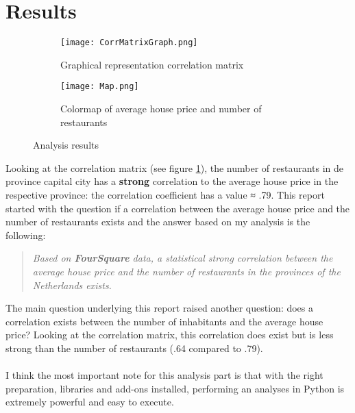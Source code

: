 \section{Results}
\medskip
\begin{figure}[H]
	\begin{subfigure}{0.5\textwidth}
		\centering
		\texttt{[image: CorrMatrixGraph.png]} 
		\caption{Graphical representation correlation matrix}
		\label{corrMatrixGraph}
	\end{subfigure}
	\begin{subfigure}{0.5\textwidth}
		\centering
		\texttt{[image: Map.png]}
		\caption{Colormap of average house price and number of restaurants}
	\end{subfigure}
	\caption{Analysis results}
\end{figure}
\medskip
Looking at the correlation matrix (see figure \ref{corrMatrixGraph}), the number of restaurants in de province capital city has a \textbf{strong} correlation to the average house price in the respective province: the correlation coefficient has a value ≈ .79. This report started with the question if a correlation between the average house price and the number of restaurants exists and the answer based on my analysis is the following:
\medskip
\begin{quote}
\textit{Based on \textbf{FourSquare} data, a statistical strong correlation between the average house price and the number of restaurants in the provinces of the Netherlands exists.}
\end{quote}
\medskip
The main question underlying this report raised another question: does a correlation exists between the number of inhabitants and the average house price? Looking at the correlation matrix, this correlation does exist but is less strong than the number of restaurants (.64 compared to .79). 
\\\\
I think the most important note for this analysis part is that with the right preparation, libraries and add-ons installed, performing an analyses in Python is extremely powerful and easy to execute.